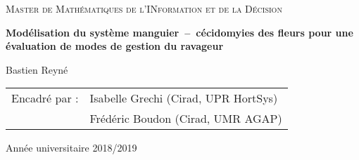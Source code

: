 
\begin{titlingpage}


\vspace*{2.5cm}

\begin{center}
 
 {\large \textsc{Master de Mathématiques de l'INformation et de la Décision}}


 \vspace*{2cm}
 
 
 {\Large \textbf{Modélisation du système manguier~--~cécidomyies des fleurs pour une évaluation de modes de gestion du ravageur}}
 \vspace*{1cm}
 
 Bastien Reyné
 
\end{center}

\vspace*{2cm}

\noindent
\begin{tabular}{ll}
Encadré par : & Isabelle Grechi (Cirad, UPR HortSys)\\
 & Frédéric Boudon (Cirad, UMR AGAP)
\end{tabular}

\vspace*{2cm}

\begin{center}
\end{center}



\vfill

\begin{center}
 Année universitaire 2018/2019
\end{center}


\end{titlingpage}
